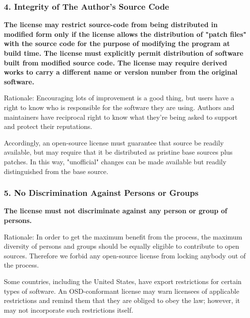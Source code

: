 
\begin{frame}
\frametitle{4. Integrity of The Author's Source Code}

{\bf
The license may restrict source-code from being distributed in modified form only if the license allows the distribution of "patch files" with the source code for the purpose of modifying the program at build time. The license must explicitly permit distribution of software built from modified source code. The license may require derived works to carry a different name or version number from the original software.}

\vspace{.2cm}
Rationale: Encouraging lots of improvement is a good thing, but users have a right to know who is responsible for the software they are using. Authors and maintainers have reciprocal right to know what they're being asked to support and protect their reputations.

Accordingly, an open-source license must guarantee that source be
readily available, but may require that it be distributed as pristine
base sources plus patches. In this way, "unofficial" changes can be
made available but readily distinguished from the base source.

\end{frame}


\begin{frame}
\frametitle{5. No Discrimination Against Persons or Groups}

{\bf
The license must not discriminate against any person or group of persons.}

\vspace{.2cm}
Rationale: In order to get the maximum benefit from the process, the
maximum diversity of persons and groups should be equally eligible to
contribute to open sources. Therefore we forbid any open-source
license from locking anybody out of the process.

Some countries, including the United States, have export restrictions
for certain types of software. An OSD-conformant license may warn
licensees of applicable restrictions and remind them that they are
obliged to obey the law; however, it may not incorporate such
restrictions itself.

\end{frame}


